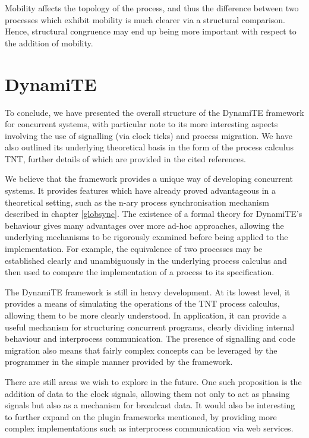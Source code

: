 Mobility affects the topology of the process, and thus the difference
between two processes which exhibit mobility is much clearer via a
structural comparison.  Hence, structural congruence may end up being
more important with respect to the addition of mobility.

\section{DynamiTE}
\label{future:dynamite}

To conclude, we have presented the overall structure of the DynamiTE
framework for concurrent systems, with particular note to its more
interesting aspects involving the use of signalling (via clock ticks)
and process migration.  We have also outlined its underlying theoretical
basis in the form of the process calculus TNT, further details of which
are provided in the cited references.

We believe that the framework provides a unique way of developing
concurrent systems.  It provides features which have already proved
advantageous in a theoretical setting, such as the n-ary process
synchronisation mechanism described in chapter \ref{globsync}.  The
existence of a formal theory for DynamiTE's behaviour gives many
advantages over more ad-hoc approaches, allowing the underlying
mechanisms to be rigorously examined before being applied to the
implementation.  For example, the equivalence of two processes may be
established clearly and unambiguously in the underlying process
calculus and then used to compare the implementation of a process to
its specification.

The DynamiTE framework is still in heavy development.  At its lowest
level, it provides a means of simulating the operations of the TNT
process calculus, allowing them to be more clearly understood.  In
application, it can provide a useful mechanism for structuring
concurrent programs, clearly dividing internal behaviour and
interprocess communication.  The presence of signalling and code
migration also means that fairly complex concepts can be leveraged by
the programmer in the simple manner provided by the framework.

There are still areas we wish to explore in the future.  One such
proposition is the addition of data to the clock signals, allowing
them not only to act as phasing signals but also as a mechanism for
broadcast data.  It would also be interesting to further expand on the
plugin frameworks mentioned, by providing more complex implementations
such as interprocess communication via web services.

